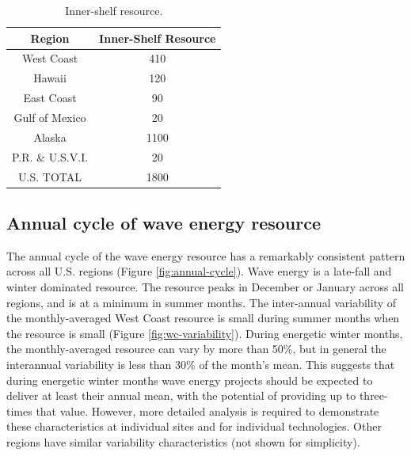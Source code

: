 
\begin{table}[ht]
  \centering
  \begin{tabular}{|c|c|}
    \hline
    Region & Inner-Shelf Resource \\
    \hline
    West Coast & 410 \\
    Hawaii & 120 \\
    East Coast & 90 \\
    Gulf of Mexico & 20 \\
    Alaska & 1100 \\
    P.R. \& U.S.V.I. & 20 \\
    \hline \hline
    U.S. TOTAL & 1800 \\
    \hline
  \end{tabular}
  \caption{Inner-shelf resource. }
  \label{tab:nearshore-total}
\end{table}

\subsection{Annual cycle of wave energy resource}

The annual cycle of the wave energy resource has a remarkably consistent pattern across all U.S. regions (Figure \ref{fig:annual-cycle}). Wave energy is a late-fall and winter dominated resource. The resource peaks in December or January across all regions, and is at a minimum in summer months. The inter-annual variability of the monthly-averaged West Coast resource is small during summer months when the resource is small (Figure \ref{fig:wc-variability}). During energetic winter months, the monthly-averaged resource can vary by more than 50\%, but in general the interannual variability is less than 30\% of the month's mean. This suggests that during energetic winter months wave energy projects should be expected to deliver at least their annual mean, with the potential of providing up to three-times that value.  However, more detailed analysis is required to demonstrate these characteristics at individual sites and for individual technologies. Other regions have similar variability characteristics (not shown for simplicity).

